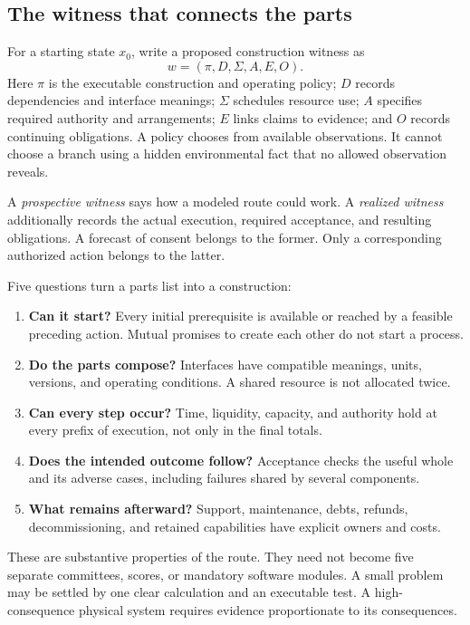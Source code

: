 \subsection{The witness that connects the parts}

For a starting state $x_0$, write a proposed construction witness as
\begin{equation}
w=(\pi,D,\Sigma,A,E,O).
\label{eq:witness}
\end{equation}
Here $\pi$ is the executable construction and operating policy; $D$ records dependencies and interface meanings; $\Sigma$ schedules resource use; $A$ specifies required authority and arrangements; $E$ links claims to evidence; and $O$ records continuing obligations. A policy chooses from available observations. It cannot choose a branch using a hidden environmental fact that no allowed observation reveals.

A \emph{prospective witness} says how a modeled route could work. A \emph{realized witness} additionally records the actual execution, required acceptance, and resulting obligations. A forecast of consent belongs to the former. Only a corresponding authorized action belongs to the latter.

Five questions turn a parts list into a construction:
\begin{enumerate}
\item \textbf{Can it start?} Every initial prerequisite is available or reached by a feasible preceding action. Mutual promises to create each other do not start a process.
\item \textbf{Do the parts compose?} Interfaces have compatible meanings, units, versions, and operating conditions. A shared resource is not allocated twice.
\item \textbf{Can every step occur?} Time, liquidity, capacity, and authority hold at every prefix of execution, not only in the final totals.
\item \textbf{Does the intended outcome follow?} Acceptance checks the useful whole and its adverse cases, including failures shared by several components.
\item \textbf{What remains afterward?} Support, maintenance, debts, refunds, decommissioning, and retained capabilities have explicit owners and costs.
\end{enumerate}

These are substantive properties of the route. They need not become five separate committees, scores, or mandatory software modules. A small problem may be settled by one clear calculation and an executable test. A high-consequence physical system requires evidence proportionate to its consequences.

